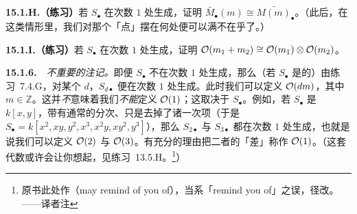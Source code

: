 \textbf{15.1.H.（练习）}\quad 若 $S_\bullet$ 在次数 $1$ 处生成，证明 $\widetilde{M_\bullet}(m)\cong\widetilde{M(m)_\bullet}$。（此后，在这类情形里，我们对那个「点」摆在何处便可以满不在乎了。）

\textbf{15.1.I.（练习）}\quad 若 $S_\bullet$ 在次数 $1$ 处生成，证明 $\mathcal{O}(m_1+m_2)\cong\mathcal{O}(m_1)\otimes\mathcal{O}(m_2)$。

\textbf{15.1.6.}\ \hard\ \emph{不重要的注记。}\quad 即便 $S_\bullet$ 不在次数 $1$ 处生成，那么（若 $S_\bullet$ 是\trFinitelyGenerated{}的）由\mbox{练习~7.4.G}，对某个 $d$，$S_{d\bullet}$ 便在次数 $1$ 处生成。此时我们可以定义\trInvertibleSheaf{} $\mathcal{O}(dm)$，其中 $m\in\mathbb{Z}$。这并\emph{不}意味着我们\emph{不能}定义 $\mathcal{O}(1)$；这取决于 $S_\bullet$。例如，若 $S_\bullet$ 是\trPolynomialRing{} $k[x,y]$，带有通常的分次、只是去掉了诸一次项（于是 $S_\bullet=k[x^2,xy,y^2,x^3,x^2y,xy^2,y^3]$），那么 $S_{2\bullet}$ 与 $S_{3\bullet}$ 都在次数 $1$ 处生成，也就是说我们可以定义 $\mathcal{O}(2)$ 与 $\mathcal{O}(3)$。有充分的理由把二者的「差」称作 $\mathcal{O}(1)$。（这套代数或许会让你想起\trPinchedPlane，见\mbox{练习~13.5.H}。\footnote{原书此处作（may remind of you of），当系「remind you of」之误，径改。——译者注}）

